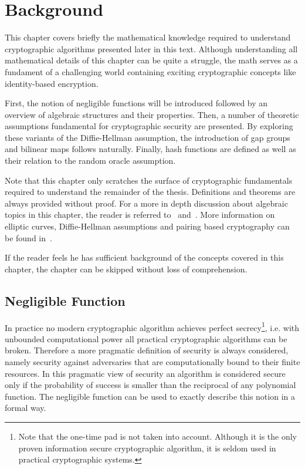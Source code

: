 \chapter{Background}
\label{cha:1}
This chapter covers briefly the mathematical knowledge required to understand cryptographic algorithms presented later in this text. Although understanding all mathematical details of this chapter can be quite a struggle, the math serves as a fundament of a challenging world containing exciting cryptographic concepts like identity-based encryption.

First, the notion of negligible functions will be introduced followed by an overview of algebraic structures and their properties. Then, a number of theoretic assumptions fundamental for cryptographic security are presented. By exploring these variants of the Diffie-Hellman assumption, the introduction of gap groups and bilinear maps follows naturally. Finally, hash functions are defined as well as their relation to the random oracle assumption.

Note that this chapter only scratches the surface of cryptographic fundamentals required to understand the remainder of the thesis. Definitions and theorems are always provided without proof. For a more in depth discussion about algebraic topics in this chapter, the reader is referred to~\cite{book:handbook_of_applied_cryptography} and~\cite{book:survey_of_modern_algebra}. More information on elliptic curves, Diffie-Hellman assumptions and pairing based cryptography can be found in~\cite{thesis:Maas04}.

If the reader feels he has sufficient background of the concepts covered in this chapter, the chapter can be skipped without loss of comprehension.

\section{Negligible Function}

In practice no modern cryptographic algorithm achieves perfect secrecy\footnote{Note that the one-time pad is not taken into account. Although it is the only proven information secure cryptographic algorithm, it is seldom used in practical cryptographic systems.}, i.e. with unbounded computational power all practical cryptographic algorithms can be broken. Therefore a more pragmatic definition of security is always considered, namely security against adversaries that are computationally bound to their finite resources. In this pragmatic view of security an algorithm is considered secure only if the probability of success is smaller than the reciprocal of any polynomial function. The negligible function can be used to exactly describe this notion in a formal way.

